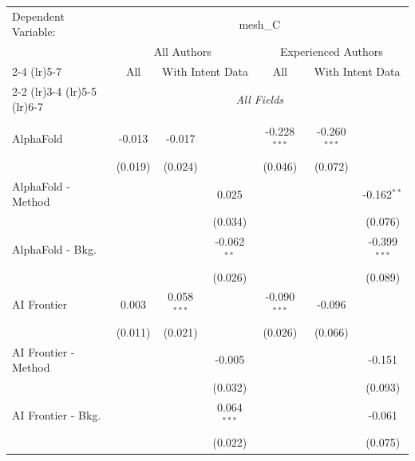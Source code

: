 \begingroup
\centering
\begin{tabular}{lcccccc}
   \tabularnewline \midrule \midrule
   Dependent Variable: & \multicolumn{6}{c}{mesh\_C}\\
 & \multicolumn{3}{c}{All Authors} & \multicolumn{3}{c}{Experienced Authors} \\
\cmidrule(lr){2-4} \cmidrule(lr){5-7}
 & \multicolumn{1}{c}{All} & \multicolumn{2}{c}{With Intent Data} & \multicolumn{1}{c}{All} & \multicolumn{2}{c}{With Intent Data} \\
\cmidrule(lr){2-2} \cmidrule(lr){3-4} \cmidrule(lr){5-5} \cmidrule(lr){6-7}
 & \multicolumn{6}{c}{\textit{All Fields}} \\ \\
   AlphaFold            & -0.013        & -0.017        &               & -0.228$^{***}$ & -0.260$^{***}$ &   \\   
                        & (0.019)       & (0.024)       &               & (0.046)        & (0.072)        &   \\   
   AlphaFold - Method   &               &               & 0.025         &                &                & -0.162$^{**}$\\   
                        &               &               & (0.034)       &                &                & (0.076)\\   
   AlphaFold - Bkg.     &               &               & -0.062$^{**}$ &                &                & -0.399$^{***}$\\   
                        &               &               & (0.026)       &                &                & (0.089)\\   
   AI Frontier          & 0.003         & 0.058$^{***}$ &               & -0.090$^{***}$ & -0.096         &   \\   
                        & (0.011)       & (0.021)       &               & (0.026)        & (0.066)        &   \\   
   AI Frontier - Method &               &               & -0.005        &                &                & -0.151\\   
                        &               &               & (0.032)       &                &                & (0.093)\\   
   AI Frontier - Bkg.   &               &               & 0.064$^{***}$ &                &                & -0.061\\   
                        &               &               & (0.022)       &                &                & (0.075)\\   

\end{tabular}
